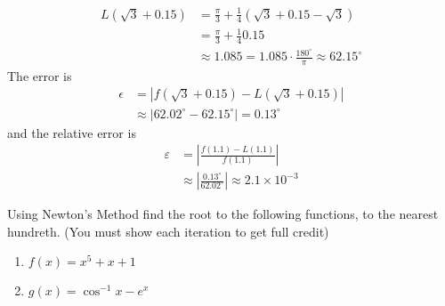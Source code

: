 \documentclass{hwset}
\begin{document}
\begin{solution}
\begin{enumerate}
			\begin{align*}
				L(\sqrt{3}+0.15) &= \frac{\pi}{3} + \frac{1}{4}(\sqrt{3} + 0.15 -
					\sqrt{3}) \\
				&= \frac{\pi}{3} + \frac{1}{4}  0.15 \\
				&\approx 1.085 = 1.085 \cdot \frac{180^\circ}{\pi} \approx
				\boxed{62.15^\circ}
			\end{align*}
			The error is 
			\begin{align*}
				\epsilon &= |f(\sqrt{3}+0.15) - L(\sqrt{3}+0.15)|\\
				&\approx |62.02^\circ - 62.15^\circ| = \boxed{0.13^\circ}
			\end{align*}
			and the relative error is
			\begin{align*}
				\varepsilon &= \left|\frac{f(1.1) - L(1.1)}{f(1.1)}\right|\\
				&\approx \left|\frac{0.13^\circ}{62.02^\circ}\right| \approx \boxed{2.1
				\times 10^{-3}}
			\end{align*}
	\end{enumerate}
\end{solution}

\begin{problem}[2.]
	Using Newton's Method find the root to the following functions, to the nearest
	hundreth. (You must show each iteration to get full credit)
	\begin{enumerate}
		\item $f(x) = x^5 + x + 1$
		\item $g(x) = \cos^{-1} x - e^x$
	\end{enumerate}
\end{problem}
\end{document}
